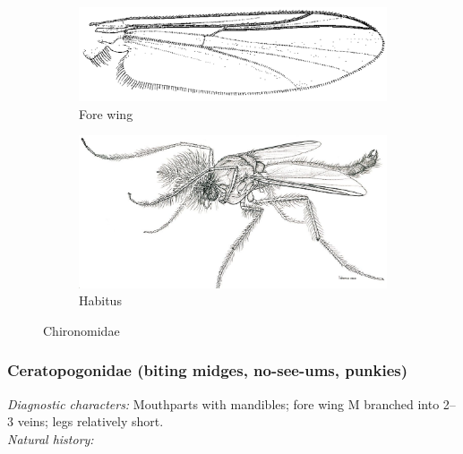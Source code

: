 \documentclass[letterpaper, 11pt]{article}
\begin{document}
\begin{figure}[ht!]
    \centering
    \begin{subfigure}[ht!]{0.45\textwidth}
        \includegraphics[width=\textwidth]{ChironomidWing}
        \caption{Fore wing \citep[][Fig. 29.9]{mcalpine1981manual}}
        \label{fig:chiron1}
    \end{subfigure}
    \qquad 
    \begin{subfigure}[ht!]{0.45\textwidth}
        \includegraphics[width=\textwidth]{ChironomidHabitus}
        \caption{Habitus \citep[][Fig. 29.1]{mcalpine1981manual}}
        \label{fig:chiron2}
    \end{subfigure}
    \caption{Chironomidae}\label{fig:chironomids}
\end{figure}

\subsubsection{Ceratopogonidae (biting midges, no-see-ums, punkies)}
\noindent{}\textit{Diagnostic characters:} Mouthparts with mandibles; fore wing M branched into 2--3 veins; legs relatively short. \\%

\noindent{}\textit{Natural history:} \\
\end{document}

